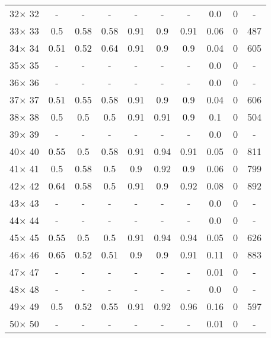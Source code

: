\documentclass[main.tex]{subfiles}
\begin{document}
\begin{table}
\begin{tabular}{|c||c|c|c|c|c|c||c|c|c|}
32$\times$ 32 & - & - & - & - & - & - &0.0 &0 &-\\
33$\times$ 33 &0.5 &0.58 &0.58 &0.91 &0.9 &0.91 &0.06 &0 &487\\
34$\times$ 34 &0.51 &0.52 &0.64 &0.91 &0.9 &0.9 &0.04 &0 &605\\
35$\times$ 35 & - & - & - & - & - & - &0.0 &0 &-\\
36$\times$ 36 & - & - & - & - & - & - &0.0 &0 &-\\
37$\times$ 37 &0.51 &0.55 &0.58 &0.91 &0.9 &0.9 &0.04 &0 &606\\
38$\times$ 38 &0.5 &0.5 &0.5 &0.91 &0.91 &0.9 &0.1 &0 &504\\
39$\times$ 39 & - & - & - & - & - & - &0.0 &0 &-\\
40$\times$ 40 &0.55 &0.5 &0.58 &0.91 &0.94 &0.91 &0.05 &0 &811\\
41$\times$ 41 &0.5 &0.58 &0.5 &0.9 &0.92 &0.9 &0.06 &0 &799\\
42$\times$ 42 &0.64 &0.58 &0.5 &0.91 &0.9 &0.92 &0.08 &0 &892\\
43$\times$ 43 & - & - & - & - & - & - &0.0 &0 &-\\
44$\times$ 44 & - & - & - & - & - & - &0.0 &0 &-\\
45$\times$ 45 &0.55 &0.5 &0.5 &0.91 &0.94 &0.94 &0.05 &0 &626\\
46$\times$ 46 &0.65 &0.52 &0.51 &0.9 &0.9 &0.91 &0.11 &0 &883\\
47$\times$ 47 & - & - & - & - & - & - &0.01 &0 &-\\
48$\times$ 48 & - & - & - & - & - & - &0.0 &0 &-\\
49$\times$ 49 &0.5 &0.52 &0.55 &0.91 &0.92 &0.96 &0.16 &0 &597\\
50$\times$ 50 & - & - & - & - & - & - &0.01 &0 &-\\
\hline
\end{tabular}
\end{table}
\end{document}
